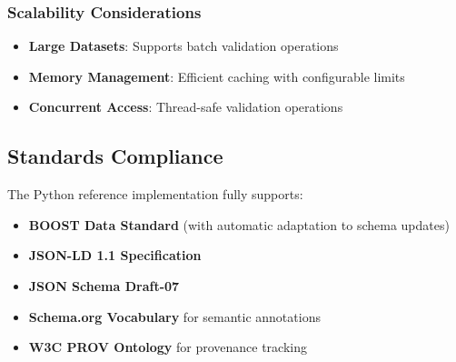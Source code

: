 \subsubsection{Scalability Considerations}
\label{sec:python-scalability}

\begin{itemize}
    \item \textbf{Large Datasets}: Supports batch validation operations
    \item \textbf{Memory Management}: Efficient caching with configurable limits
    \item \textbf{Concurrent Access}: Thread-safe validation operations
\end{itemize}

\subsection{Standards Compliance}
\label{sec:python-standards}

The Python reference implementation fully supports:

\begin{itemize}
    \item \textbf{BOOST Data Standard} (with automatic adaptation to schema updates)
    \item \textbf{JSON-LD 1.1 Specification}
    \item \textbf{JSON Schema Draft-07}
    \item \textbf{Schema.org Vocabulary} for semantic annotations
    \item \textbf{W3C PROV Ontology} for provenance tracking
\end{itemize}